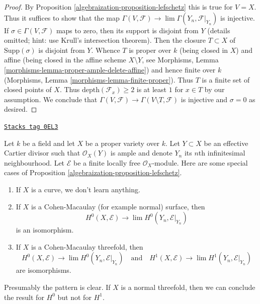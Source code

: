 \begin{proof}

By Proposition \ref{algebraization-proposition-lefschetz} this is true for $V = X$.
Thus it suffices to show that the map
$\Gamma(V, \mathcal{F}) \to \lim \Gamma(Y_n, \mathcal{F}|_{Y_n})$
is injective. If $\sigma \in \Gamma(V, \mathcal{F})$
maps to zero, then its support is disjoint from $Y$ (details omitted; hint:
use Krull's intersection theorem). Then the closure $T \subset X$
of $\text{Supp}(\sigma)$ is disjoint from $Y$.
Whence $T$ is proper over $k$ (being closed in $X$)
and affine (being closed in the affine scheme $X \setminus Y$, see
Morphisms, Lemma \ref{morphisms-lemma-proper-ample-delete-affine})
and hence finite over $k$
(Morphisms, Lemma \ref{morphisms-lemma-finite-proper}).
Thus $T$ is a finite set of closed points of $X$.
Thus $\text{depth}(\mathcal{F}_x) \geq 2$ is at least $1$
for $x \in T$ by our assumption. We conclude that
$\Gamma(V, \mathcal{F}) \to \Gamma(V \setminus T, \mathcal{F})$
is injective and $\sigma = 0$ as desired.
\end{proof}


\begin{example}[Lefschetz]
\label{algebraization-example-lefschetz}
\href{https://stacks.math.columbia.edu/tag/0EL3}{\texttt{Stacks tag 0EL3}}

Let $k$ be a field and let $X$ be a proper variety over $k$.
Let $Y \subset X$ be an effective Cartier divisor such that
$\mathcal{O}_X(Y)$ is ample and
denote $Y_n$ its $n$th infinitesimal neighbourhood.
Let $\mathcal{E}$ be a finite locally free $\mathcal{O}_X$-module.
Here are some special cases of Proposition \ref{algebraization-proposition-lefschetz}.
\begin{enumerate}
\item If $X$ is a curve, we don't learn anything.
\item If $X$ is a Cohen-Macaulay (for example normal) surface, then
$$
H^0(X, \mathcal{E}) \to \lim H^0(Y_n, \mathcal{E}|_{Y_n})
$$
is an isomorphism.
\item If $X$ is a Cohen-Macaulay threefold, then
$$
H^0(X, \mathcal{E}) \to \lim H^0(Y_n, \mathcal{E}|_{Y_n})
\quad\text{and}\quad
H^1(X, \mathcal{E}) \to \lim H^1(Y_n, \mathcal{E}|_{Y_n})
$$
are isomorphisms.
\end{enumerate}
Presumably the pattern is clear. If $X$ is a normal threefold, then
we can conclude the result for $H^0$ but not for $H^1$.
\end{example}

